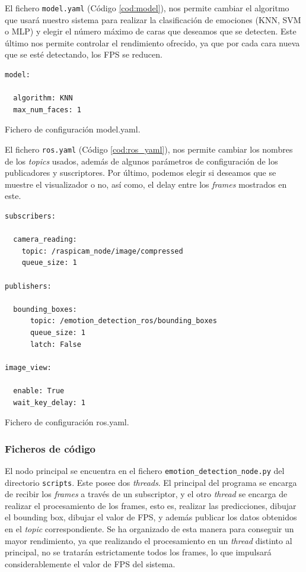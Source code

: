 El fichero \verb|model.yaml| (Código \ref{cod:model}), nos permite cambiar el algoritmo que usará nuestro sistema para realizar la clasificación de emociones (KNN, SVM o MLP) y elegir el número máximo de caras que deseamos que se detecten. Este último nos permite controlar el rendimiento ofrecido, ya que por cada cara nueva que se esté detectando, los FPS se reducen.\\

\begin{code}[h]
\begin{lstlisting}
model:

  algorithm: KNN
  max_num_faces: 1
\end{lstlisting}
\captionsetup{justification=centering}
\caption[Fichero de configuración model.yaml.]{Fichero de configuración model.yaml.}
\label{cod:model}
\end{code}

El fichero \verb|ros.yaml| (Código \ref{cod:ros_yaml}), nos permite cambiar los nombres de los \textit{topics} usados, además de algunos parámetros de configuración de los publicadores y suscriptores. Por último, podemos elegir si deseamos que se muestre el visualizador o no, así como, el delay entre los \textit{frames} mostrados en este.

\begin{code}[h]
\begin{lstlisting}
subscribers:

  camera_reading:
    topic: /raspicam_node/image/compressed
    queue_size: 1

publishers:

  bounding_boxes:
      topic: /emotion_detection_ros/bounding_boxes
      queue_size: 1
      latch: False

image_view:

  enable: True
  wait_key_delay: 1
\end{lstlisting}
\captionsetup{justification=centering}
\caption[Fichero de configuración ros.yaml.]{Fichero de configuración ros.yaml.}
\label{cod:ros_yaml}
\end{code}

\subsubsection{Ficheros de código}

El nodo principal se encuentra en el fichero \verb|emotion_detection_node.py| del directorio \verb|scripts|. Este posee dos \textit{threads}. El principal del programa se encarga de recibir los \textit{frames} a través de un subscriptor, y el otro \textit{thread} se encarga de realizar el procesamiento de los frames, esto es, realizar las predicciones, dibujar el bounding box, dibujar el valor de FPS, y además publicar los datos obtenidos en el \textit{topic} correspondiente. Se ha organizado de esta manera para conseguir un mayor rendimiento, ya que realizando el procesamiento en un \textit{thread} distinto al principal, no se tratarán estrictamente todos los frames, lo que impulsará considerablemente el valor de FPS del sistema.\\

